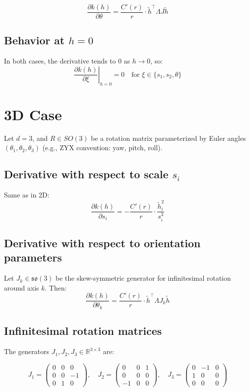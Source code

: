 \documentclass{article}
\begin{document}
\[
\frac{\partial k(h)}{\partial \theta} = \frac{C'(r)}{r} \cdot \tilde{h}^\top \Lambda J \tilde{h}
\]

\subsection*{Behavior at \( h = 0 \)}

In both cases, the derivative tends to 0 as \( h \to 0 \), so:
\[
\left. \frac{\partial k(h)}{\partial \xi} \right|_{h = 0} = 0
\quad \text{for } \xi \in \{s_1, s_2, \theta\}
\]

\section*{3D Case}

Let \( d = 3 \), and \( R \in SO(3) \) be a rotation matrix parameterized by Euler angles \( (\theta_1, \theta_2, \theta_3) \) (e.g., ZYX convention: yaw, pitch, roll).

\subsection*{Derivative with respect to scale \( s_i \)}

Same as in 2D:
\[
\frac{\partial k(h)}{\partial s_i} = - \frac{C'(r)}{r} \cdot \frac{\tilde{h}_i^2}{s_i^3}
\]

\subsection*{Derivative with respect to orientation parameters}

Let \( J_k \in \mathfrak{so}(3) \) be the skew-symmetric generator for infinitesimal rotation around axis \( k \). Then:
\[
\frac{\partial k(h)}{\partial \theta_k} = \frac{C'(r)}{r} \cdot \tilde{h}^\top \Lambda J_k \tilde{h}
\]

\subsection*{Infinitesimal rotation matrices}

The generators \( J_1, J_2, J_3 \in \mathbb{R}^{3 \times 3} \) are:

\[
J_1 = \begin{pmatrix}
0 & 0 & 0 \\
0 & 0 & -1 \\
0 & 1 & 0
\end{pmatrix}, \quad
J_2 = \begin{pmatrix}
0 & 0 & 1 \\
0 & 0 & 0 \\
-1 & 0 & 0
\end{pmatrix}, \quad
J_3 = \begin{pmatrix}
0 & -1 & 0 \\
1 & 0 & 0 \\
0 & 0 & 0
\end{pmatrix}
\]
\end{document}
